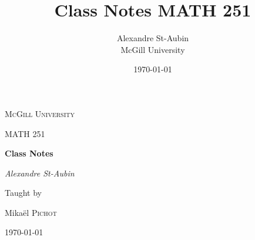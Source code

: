\documentclass[12pt]{article}
\title{Class Notes MATH 251}
\author{Alexandre St-Aubin \\ McGill University}
\date{\today}
\theoremstyle{definition}
\theoremstyle{remark}
\begin{document}
\begin{titlepage}
	\centering
	{\scshape McGill University \par}
	\vspace{1cm}
	{\scshape\Large MATH 251\par}
	\vspace{1.5cm}
	{\huge\bfseries Class Notes\par}
	\vspace{2cm}
	{\Large\itshape Alexandre St-Aubin\par}
	\vfill
	Taught by \par
	Mikaël \textsc{Pichot}

	\vfill

	{\large \today\par}
\end{titlepage}

\tableofcontents

\newpage
\end{document}

